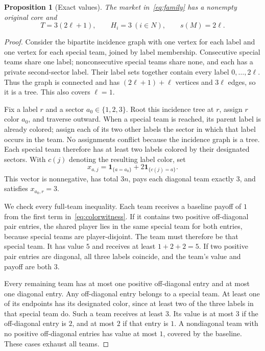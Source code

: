 \documentclass[11pt]{article}
\newtheorem{proposition}[theorem]{Proposition}
\theoremstyle{remark}
\newcommand{\one}{\mathbf 1}
\begin{document}
\begin{proposition}[Exact values]\label{prop:family}
The market in~\eqref{eq:family} has a nonempty original core and
\begin{equation}\label{eq:familyvalues}
            T=3(2\ell+1),\qquad H_i=3\ (i\in N),\qquad s(M)=2\ell.
\end{equation}
\end{proposition}
\begin{proof}
Consider the bipartite incidence graph with one vertex for each label
and one vertex for each special team, joined by label membership.
Consecutive special teams share one label; nonconsecutive special teams
share none, and each has a private second-sector label. Their label sets
together contain every label $0,\ldots,2\ell$. Thus the graph is connected
and has $(2\ell+1)+\ell$ vertices and $3\ell$ edges, so it
is a tree. This also covers $\ell=1$.

Fix a label $r$ and a sector $a_0\in\{1,2,3\}$. Root this incidence
tree at $r$, assign $r$ color $a_0$, and traverse outward. When a special
team is reached, its parent label is already colored; assign each of its
two other labels the sector in which that label occurs in the team.
No assignments conflict because the incidence graph is a tree. Each
special team therefore has at least two labels colored by their designated
sectors. With $c(j)$ denoting the resulting label color, set
\begin{equation}\label{eq:colorwitness}
           x_{a,j}=\one_{\{a=a_0\}}+2\one_{\{c(j)=a\}}.
\end{equation}
This vector is nonnegative, has total $3n$, pays each diagonal team
exactly $3$, and satisfies $x_{a_0,r}=3$.

We check every full-team inequality. Each team receives a baseline payoff
of $1$ from the first term in~\eqref{eq:colorwitness}. If it contains two
positive off-diagonal pair entries, the shared player lies in the same
special team for both entries, because special teams are player-disjoint.
The team must therefore be that special team. It has value $5$ and receives
at least $1+2+2=5$. If two positive pair entries are diagonal, all three
labels coincide, and the team's value and payoff are both $3$.

Every remaining team has at most one positive off-diagonal entry and at
most one diagonal entry. Any off-diagonal entry belongs to a special team.
At least one of its endpoints has its designated color, since at least two
of the three labels in that special team do. Such a team receives at least
$3$. Its value is at most $3$ if the off-diagonal entry is $2$, and at
most $2$ if that entry is $1$. A nondiagonal team with no positive
off-diagonal entries has value at most $1$, covered by the baseline.
These cases exhaust all teams.


\end{proof}
\end{document}
